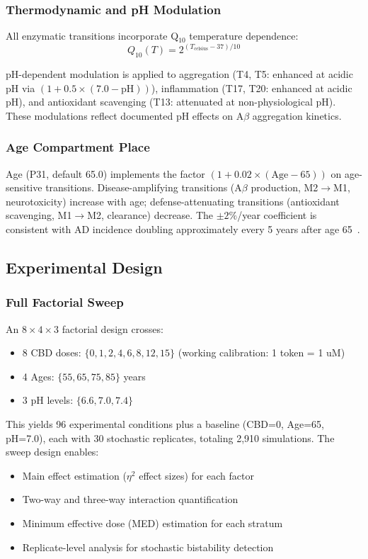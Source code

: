 \documentclass[10pt,letterpaper]{article}
\begin{document}
\subsubsection{Thermodynamic and pH Modulation}

All enzymatic transitions incorporate Q$_{10}$ temperature dependence:
\begin{equation}
Q_{10}(T) = 2^{(T_{\text{celsius}} - 37)/10}
\end{equation}

pH-dependent modulation is applied to aggregation (T4, T5: enhanced at acidic pH via $(1 + 0.5 \times (7.0 - \text{pH}))$), inflammation (T17, T20: enhanced at acidic pH), and antioxidant scavenging (T13: attenuated at non-physiological pH). These modulations reflect documented pH effects on A$\beta$ aggregation kinetics.

\subsubsection{Age Compartment Place}

Age (P31, default 65.0) implements the factor $(1 + 0.02 \times (\text{Age} - 65))$ on age-sensitive transitions. Disease-amplifying transitions (A$\beta$ production, M2$\to$M1, neurotoxicity) increase with age; defense-attenuating transitions (antioxidant scavenging, M1$\to$M2, clearance) decrease. The $\pm 2\%$/year coefficient is consistent with AD incidence doubling approximately every 5 years after age 65~\cite{ferri2005}.

\subsection{Experimental Design}

\subsubsection{Full Factorial Sweep}

An $8 \times 4 \times 3$ factorial design crosses:
\begin{itemize}
\item 8 CBD doses: $\{0, 1, 2, 4, 6, 8, 12, 15\}$ (working calibration: 1 token = 1 uM)
\item 4 Ages: $\{55, 65, 75, 85\}$ years
\item 3 pH levels: $\{6.6, 7.0, 7.4\}$
\end{itemize}

This yields 96 experimental conditions plus a baseline (CBD=0, Age=65, pH=7.0), each with 30 stochastic replicates, totaling 2,910 simulations. The sweep design enables:
\begin{itemize}
\item Main effect estimation ($\eta^2$ effect sizes) for each factor
\item Two-way and three-way interaction quantification
\item Minimum effective dose (MED) estimation for each stratum
\item Replicate-level analysis for stochastic bistability detection
\end{itemize}
\end{document}
